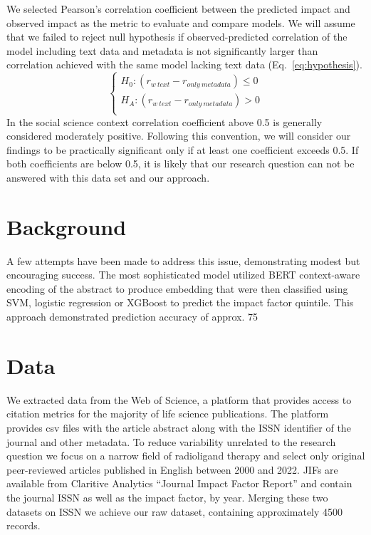 \documentclass[11pt]{article}
\begin{document}
We selected Pearson's correlation coefficient between the predicted impact and observed impact as the metric to evaluate and compare models. We will assume that we failed to reject null hypothesis if observed-predicted correlation of the model including text data and metadata is not significantly larger than correlation achieved with the same model lacking text data (Eq.~\ref{eq:hypothesis}).
\begin{equation}\label{eq:hypothesis}
	\begin{cases}
		H_{0}: (r_{w\ text} - r_{only\ metadata}) \leq 0 \\
		H_{A}: (r_{w\ text} - r_{only\ metadata}) > 0\\
	\end{cases}       
\end{equation}
In the social science context correlation coefficient above 0.5 is generally considered moderately positive\citep{KahnemanDaniel2021N:af}. Following this convention, we will consider our findings to be practically significant only if at least one coefficient exceeds 0.5. If both coefficients are below 0.5, it is likely that our research question can not be answered with this data set and our approach. 

\section{Background}
A few attempts have been made to address this issue, demonstrating modest but encouraging success. \citep{Macri2023-tr, Alohali2022-no, 10.1162/qss_a_00258, doi:10.1152/japplphysiol.00489.2020} The most sophisticated model utilized BERT context-aware encoding of the abstract to produce embedding that were then classified using  SVM, logistic regression or XGBoost to predict the impact factor quintile. This approach demonstrated prediction accuracy of approx. 75%

\section{Data}
We extracted data from the Web of Science, a platform that provides access to citation metrics for the majority of life science publications. The platform provides csv files with the article abstract along with the ISSN identifier of the journal and other metadata. To reduce variability unrelated to the research question we focus on a narrow field of radioligand therapy and select only original peer-reviewed articles published in English between 2000 and 2022. JIFs are available from Claritive Analytics “Journal Impact Factor Report” and contain the journal ISSN as well as the impact factor, by year. Merging these two datasets on ISSN we achieve our raw dataset, containing approximately 4500 records.
\end{document}
